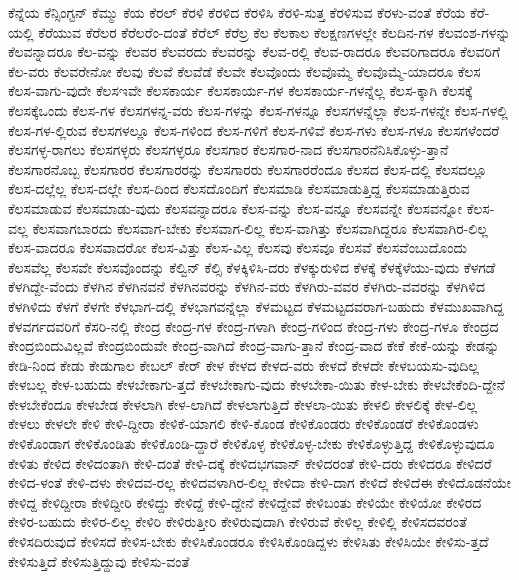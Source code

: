 {ಕೆನ್ನೆಯ
ಕೆನ್ಸಿಂಗ್ಟನ್
ಕೆಮ್ಮು
ಕೆಯ
ಕೆರಲ್
ಕೆರಳಿ
ಕೆರಳಿದ
ಕೆರಳಿಸಿ
ಕೆರಳಿ-ಸುತ್ತ
ಕೆರಳಿಸುವ
ಕೆರಳು-ವಂತೆ
ಕೆರೆಯ
ಕೆರೆ-ಯಲ್ಲಿ
ಕೆರೆಯುವ
ಕೆರೆಲರ
ಕೆರೆಲರೆಂ-ದಂತೆ
ಕೆರೆಲ್
ಕೆರೆಲ್ರ
ಕೆಲ
ಕೆಲಕಾಲ
ಕೆಲಕ್ಷಣಗಳಲ್ಲೇ
ಕೆಲದಿನ-ಗಳ
ಕೆಲವಂಶ-ಗಳನ್ನು
ಕೆಲವನ್ನಾದರೂ
ಕೆಲ-ವನ್ನು
ಕೆಲವರ
ಕೆಲವರದು
ಕೆಲವರನ್ನು
ಕೆಲವ-ರಲ್ಲಿ
ಕೆಲವ-ರಾದರೂ
ಕೆಲವರಿಗಾದರೂ
ಕೆಲವರಿಗೆ
ಕೆಲ-ವರು
ಕೆಲವರೇನೋ
ಕೆಲವು
ಕೆಲವೆ
ಕೆಲವೆಡೆ
ಕೆಲವೇ
ಕೆಲವೊಂದು
ಕೆಲವೊಮ್ಮೆ
ಕೆಲವೊಮ್ಮೆ-ಯಾದರೂ
ಕೆಲಸ
ಕೆಲಸ-ವಾಗು-ವುದೇ
ಕೆಲಸಇವೇ
ಕೆಲಸಕಾರ್ಯ
ಕೆಲಸಕಾರ್ಯ-ಗಳ
ಕೆಲಸಕಾರ್ಯ-ಗಳನ್ನೆಲ್ಲ
ಕೆಲಸ-ಕ್ಕಾಗಿ
ಕೆಲಸಕ್ಕೆ
ಕೆಲಸಕ್ಕೆಒಂದು
ಕೆಲಸ-ಗಳ
ಕೆಲಸಗಳನ್ನ-ವರು
ಕೆಲಸ-ಗಳನ್ನು
ಕೆಲಸ-ಗಳನ್ನೂ
ಕೆಲಸಗಳನ್ನೆಲ್ಲಾ
ಕೆಲಸ-ಗಳನ್ನೇ
ಕೆಲಸ-ಗಳಲ್ಲಿ
ಕೆಲಸ-ಗಳ-ಲ್ಲಿರುವ
ಕೆಲಸಗಳಲ್ಲೂ
ಕೆಲಸ-ಗಳಿಂದ
ಕೆಲಸ-ಗಳಿಗೆ
ಕೆಲಸ-ಗಳಿವೆ
ಕೆಲಸ-ಗಳು
ಕೆಲಸ-ಗಳೂ
ಕೆಲಸಗಳೆಂದರೆ
ಕೆಲಸಗಳ್ಳ-ರಾಗಲು
ಕೆಲಸಗಳ್ಳರು
ಕೆಲಸಗಳ್ಳರೂ
ಕೆಲಸಗಾರ
ಕೆಲಸಗಾರ-ನಾದ
ಕೆಲಸಗಾರನೆನಿಸಿಕೊಳ್ಳು-ತ್ತಾನೆ
ಕೆಲಸಗಾರನೊಬ್ಬ
ಕೆಲಸಗಾರರ
ಕೆಲಸಗಾರರನ್ನು
ಕೆಲಸಗಾರರು
ಕೆಲಸಗಾರರೆಂದೂ
ಕೆಲಸದ
ಕೆಲಸ-ದಲ್ಲಿ
ಕೆಲಸದಲ್ಲೂ
ಕೆಲಸ-ದಲ್ಲೆಲ್ಲ
ಕೆಲಸ-ದಲ್ಲೇ
ಕೆಲಸ-ದಿಂದ
ಕೆಲಸದೊಂದಿಗೆ
ಕೆಲಸಮಾಡಿ
ಕೆಲಸಮಾಡುತ್ತಿದ್ದ
ಕೆಲಸಮಾಡುತ್ತಿರುವ
ಕೆಲಸಮಾಡುವ
ಕೆಲಸಮಾಡು-ವುದು
ಕೆಲಸವನ್ನಾದರೂ
ಕೆಲಸ-ವನ್ನು
ಕೆಲಸ-ವನ್ನೂ
ಕೆಲಸವನ್ನೇ
ಕೆಲಸವನ್ನೋ
ಕೆಲಸ-ವಲ್ಲ
ಕೆಲಸವಾಗಬಾರದು
ಕೆಲಸವಾಗ-ಬೇಕು
ಕೆಲಸವಾಗ-ಲಿಲ್ಲ
ಕೆಲಸ-ವಾಗಿತ್ತು
ಕೆಲಸವಾಗಿದ್ದರೂ
ಕೆಲಸವಾಗಿರ-ಲಿಲ್ಲ
ಕೆಲಸ-ವಾದರೂ
ಕೆಲಸವಾದರೋ
ಕೆಲಸ-ವಿತ್ತು
ಕೆಲಸ-ವಿಲ್ಲ
ಕೆಲಸವು
ಕೆಲಸವೂ
ಕೆಲಸವೆ
ಕೆಲಸವೆಂಬುದೊಂದು
ಕೆಲಸವೆಲ್ಲ
ಕೆಲಸವೇ
ಕೆಲಸವೊಂದನ್ನು
ಕೆಲ್ವಿನ್
ಕೆಲ್ಸಿ
ಕೆಳಕ್ಕಿಳಿಸಿ-ದರು
ಕೆಳಕ್ಕುರುಳಿದ
ಕೆಳಕ್ಕೆ
ಕೆಳಕ್ಕೆಳೆಯು-ವುದು
ಕೆಳಗಡೆ
ಕೆಳಗಿದ್ದೇ-ವೆಂದು
ಕೆಳಗಿನ
ಕೆಳಗಿನವನೆ
ಕೆಳಗಿನವರನ್ನು
ಕೆಳಗಿನ-ವರು
ಕೆಳಗಿರು-ವವರ
ಕೆಳಗಿರು-ವವರನ್ನು
ಕೆಳಗಿಳಿದ
ಕೆಳಗಿಳಿದು
ಕೆಳಗೆ
ಕೆಳಗೇ
ಕೆಳಭಾಗ-ದಲ್ಲಿ
ಕೆಳಭಾಗವನ್ನೆಲ್ಲಾ
ಕೆಳಮಟ್ಟದ
ಕೆಳಮಟ್ಟದವರಾಗ-ಬಹುದು
ಕೆಳಮುಖವಾಗಿದ್ದ
ಕೆಳವರ್ಗದವರಿಗೆ
ಕೆಸರಿ-ನಲ್ಲಿ
ಕೇಂದ್ರ
ಕೇಂದ್ರ-ಗಳ
ಕೇಂದ್ರ-ಗಳಾಗಿ
ಕೇಂದ್ರ-ಗಳಿಂದ
ಕೇಂದ್ರ-ಗಳು
ಕೇಂದ್ರ-ಗಳೂ
ಕೇಂದ್ರದ
ಕೇಂದ್ರಬಿಂದುವಿಲ್ಲವೆ
ಕೇಂದ್ರಬಿಂದುವೇ
ಕೇಂದ್ರ-ವಾಗಿದೆ
ಕೇಂದ್ರ-ವಾಗು-ತ್ತಾನೆ
ಕೇಂದ್ರ-ವಾದ
ಕೇಕೆ
ಕೇಕೆ-ಯನ್ನು
ಕೇಡನ್ನು
ಕೇಡಿ-ನಿಂದ
ಕೇಡು
ಕೇಡುಗಾಲ
ಕೇಬಲ್
ಕೇರ್
ಕೇಳ
ಕೇಳದ
ಕೇಳದ-ವರು
ಕೇಳದೆ
ಕೇಳದೇ
ಕೇಳಬಯಸು-ವುದಿಲ್ಲ
ಕೇಳಬಲ್ಲ
ಕೇಳ-ಬಹುದು
ಕೇಳಬೇಕಾಗು-ತ್ತದೆ
ಕೇಳಬೇಕಾಗು-ವುದು
ಕೇಳಬೇಕಾ-ಯಿತು
ಕೇಳ-ಬೇಕು
ಕೇಳಬೇಕೆಂದಿ-ದ್ದೇನೆ
ಕೇಳಬೇಕೆಂದೂ
ಕೇಳಬೇಡ
ಕೇಳಲಾಗಿ
ಕೇಳ-ಲಾಗಿದೆ
ಕೇಳಲಾಗುತ್ತಿದೆ
ಕೇಳಲಾ-ಯಿತು
ಕೇಳಲಿ
ಕೇಳಲಿಕ್ಕೆ
ಕೇಳ-ಲಿಲ್ಲ
ಕೇಳಲು
ಕೇಳಲೇ
ಕೇಳಿ
ಕೇಳಿ-ದ್ದೀರಾ
ಕೇಳಿಕೆ-ಯಾಗಲಿ
ಕೇಳಿ-ಕೊಂಡ
ಕೇಳಿಕೊಂಡರು
ಕೇಳಿಕೊಂಡರೆ
ಕೇಳಿಕೊಂಡಳು
ಕೇಳಿಕೊಂಡಾಗ
ಕೇಳಿಕೊಂಡಿತು
ಕೇಳಿಕೊಂಡಿ-ದ್ದಾರೆ
ಕೇಳಿಕೊಳ್ಳ
ಕೇಳಿಕೊಳ್ಳ-ಬೇಕು
ಕೇಳಿಕೊಳ್ಳುತ್ತಿದ್ದ
ಕೇಳಿಕೊಳ್ಳುವುದೂ
ಕೇಳಿತು
ಕೇಳಿದ
ಕೇಳಿದಂತಾಗಿ
ಕೇಳಿ-ದಂತೆ
ಕೇಳಿ-ದಕ್ಕೆ
ಕೇಳಿದಭಗವಾನ್
ಕೇಳಿದರಂತೆ
ಕೇಳಿ-ದರು
ಕೇಳಿದರೂ
ಕೇಳಿದರೆ
ಕೇಳಿದ-ಳಂತೆ
ಕೇಳಿ-ದಳು
ಕೇಳಿದವ-ರಲ್ಲ
ಕೇಳಿದವಳಾಗಿರ-ಲಿಲ್ಲ
ಕೇಳಿದಾ
ಕೇಳಿ-ದಾಗ
ಕೇಳಿದೆ
ಕೇಳಿದೆಈ
ಕೇಳಿದೊಡನೆಯೇ
ಕೇಳಿದ್ದ
ಕೇಳಿದ್ದೀರಾ
ಕೇಳಿದ್ದೀರಿ
ಕೇಳಿದ್ದು
ಕೇಳಿದ್ದೆ
ಕೇಳಿ-ದ್ದೇನೆ
ಕೇಳಿದ್ದೇವೆ
ಕೇಳಿಬಂತು
ಕೇಳಿಯೇ
ಕೇಳಿಯೋ
ಕೇಳಿರದ
ಕೇಳಿರ-ಬಹುದು
ಕೇಳಿರ-ಲಿಲ್ಲ
ಕೇಳಿರಿ
ಕೇಳಿರುತ್ತೀರಿ
ಕೇಳಿರುವುದಾಗಿ
ಕೇಳಿರುವೆ
ಕೇಳಿಲ್ಲ
ಕೇಳಿಲ್ಲಿ
ಕೇಳಿಸದವರಂತೆ
ಕೇಳಿಸದಿರುವುದೆ
ಕೇಳಿಸದೆ
ಕೇಳಿಸ-ಬೇಕು
ಕೇಳಿಸಿಕೊಂಡರೂ
ಕೇಳಿಸಿಕೊಂಡಿದ್ದಳು
ಕೇಳಿಸಿತು
ಕೇಳಿಸಿಯೇ
ಕೇಳಿಸು-ತ್ತದೆ
ಕೇಳಿಸುತ್ತಿದೆ
ಕೇಳಿಸುತ್ತಿದ್ದುವು
ಕೇಳಿಸು-ವಂತೆ
}
